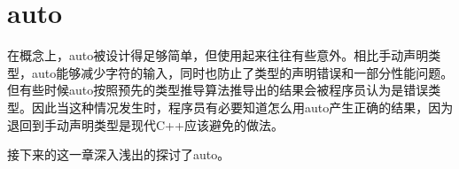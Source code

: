 \chapter{auto}
在概念上，auto被设计得足够简单，但使用起来往往有些意外。相比手动声明类型，auto能够减少字符的输入，同时也防止了类型的声明错误和一部分性能问题。但有些时候auto按照预先的类型推导算法推导出的结果会被程序员认为是错误类型。因此当这种情况发生时，程序员有必要知道怎么用auto产生正确的结果，因为退回到手动声明类型是现代C++应该避免的做法。

接下来的这一章深入浅出的探讨了auto。

